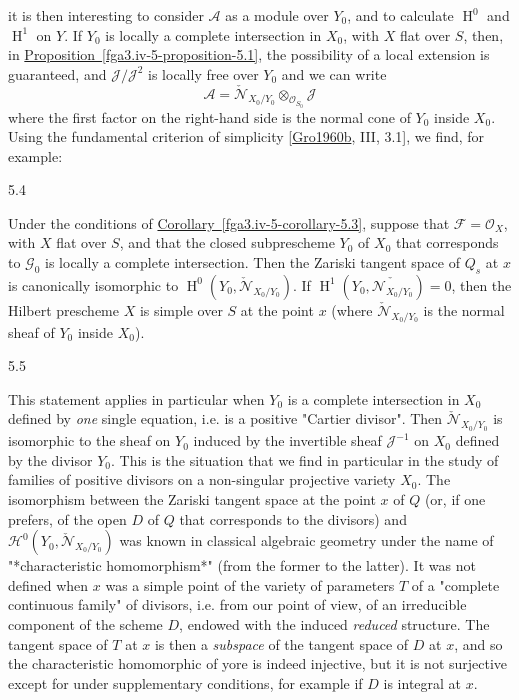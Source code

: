   it is then interesting to consider \(\mathscr {A}\) as a module over \(Y_0\), and to calculate \(\operatorname {H}^0\) and \(\operatorname {H}^1\) on \(Y\).
  If \(Y_0\) is locally a complete intersection in \(X_0\), with \(X\) flat over \(S\), then, in \hyperref[fga3.iv-5-proposition-5.1]{Proposition~\ref*{fga3.iv-5-proposition-5.1}}, the possibility of a local extension is guaranteed, and \(\mathscr {J}/\mathscr {J}^2\) is locally free over \(Y_0\) and we can write
  \[     \mathscr {A}     = \check {\mathscr {N}}_{X_0/Y_0}\otimes _{\mathcal {O}_{S_0}}\mathscr {J}   \]
  where the first factor on the right-hand side is the normal cone of \(Y_0\) inside \(X_0\).
  Using the fundamental criterion of simplicity [\hyperref[Gro1960b]{Gro1960b}, III, 3.1], we find, for example:\begin{corollary}{5.4}\label{fga3.iv-5-corollary-5.4}\skipsinglepar\par{}Under the conditions of \hyperref[fga3.iv-5-corollary-5.3]{Corollary~\ref*{fga3.iv-5-corollary-5.3}}, suppose that \(\mathscr {F}=\mathcal {O}_X\), with \(X\) flat over \(S\), and that the closed subprescheme \(Y_0\) of \(X_0\) that corresponds to \(\mathscr {G}_0\) is locally a complete intersection.
    Then the Zariski tangent space of \(Q_s\) at \(x\) is canonically isomorphic to \(\operatorname {H}^0(Y_0,\check {\mathscr {N}}_{X_0/Y_0})\).
    If \(\operatorname {H}^1(Y_0,\check {\mathscr {N}_{X_0/Y_0}})=0\), then the Hilbert prescheme \(X\) is simple over \(S\) at the point \(x\) (where \(\check {\mathscr {N}}_{X_0/Y_0}\) is the normal sheaf of \(Y_0\) inside \(X_0\)).\end{corollary}\begin{remark}{5.5}\label{fga3.iv-5-remark-5.5}\skipsinglepar\par{}This statement applies in particular when \(Y_0\) is a complete intersection in \(X_0\) defined by \emph{one} single equation, i.e. is a positive "Cartier divisor".
    Then \(\check {\mathscr {N}}_{X_0/Y_0}\) is isomorphic to the sheaf on \(Y_0\) induced by the invertible sheaf \(\mathscr {J}^{-1}\) on \(X_0\) defined by the divisor \(Y_0\).
    This is the situation that we find in particular in the study of families of positive divisors on a non-singular projective variety \(X_0\).
    The isomorphism between the Zariski tangent space at the point \(x\) of \(Q\) (or, if one prefers, of the open \(D\) of \(Q\) that corresponds to the divisors) and \(\mathscr {H}^0(Y_0,\check {\mathscr {N}}_{X_0/Y_0})\) was known in classical algebraic geometry under the name of "*characteristic homomorphism*" (from the former to the latter).
    It was not defined when \(x\) was a simple point of the variety of parameters \(T\) of a "complete continuous family" of divisors, i.e. from our point of view, of an irreducible component of the scheme \(D\), endowed with the induced \emph{reduced} structure.
    The tangent space of \(T\) at \(x\) is then a \emph{subspace} of the tangent space of \(D\) at \(x\), and so the characteristic homomorphic of yore is indeed injective, but it is not surjective except for under supplementary conditions, for example if \(D\) is integral at \(x\).
    

\end{remark}
